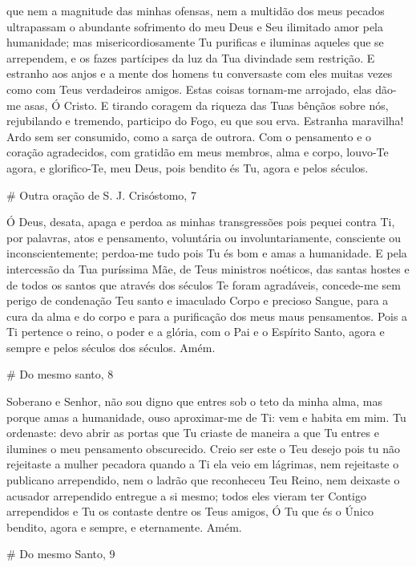 \documentclass{subfiles}
\begin{document}
que nem a magnitude das minhas ofensas, nem a multidão dos meus pecados
ultrapassam o abundante sofrimento do meu Deus e Seu ilimitado amor pela
humanidade; mas misericordiosamente Tu purificas e iluminas aqueles que se
arrependem, e os fazes partícipes da luz da Tua divindade sem restrição. E
estranho aos anjos e a mente dos homens tu conversaste com eles muitas vezes
como com Teus verdadeiros amigos. Estas coisas tornam-me arrojado, elas dão-me
asas, Ó Cristo. E tirando coragem da riqueza das Tuas bênçãos sobre nós,
rejubilando e tremendo, participo do Fogo, eu que sou erva. Estranha maravilha!
Ardo sem ser consumido, como a sarça de outrora. Com o pensamento e o coração
agradecidos, com gratidão em meus membros, alma e corpo, louvo-Te agora, e
glorifico-Te, meu Deus, pois bendito és Tu, agora e pelos séculos.

# Outra oração de S. J. Crisóstomo, 7

Ó Deus, desata, apaga e perdoa as minhas transgressões pois pequei
contra Ti, por palavras, atos e pensamento, voluntária ou involuntariamente,
consciente ou inconscientemente; perdoa-me tudo pois Tu és bom e amas a
humanidade. E pela intercessão da Tua puríssima Mãe, de Teus ministros
noéticos, das santas hostes e de todos os santos que através dos séculos Te
foram agradáveis, concede-me sem perigo de condenação Teu santo e
imaculado Corpo e precioso Sangue, para a cura da alma e do corpo e para a
purificação dos meus maus pensamentos. Pois a Ti pertence o reino, o poder
e a glória, com o Pai e o Espírito Santo, agora e sempre e pelos séculos dos
séculos. Amém.

# Do mesmo santo, 8

Soberano e Senhor, não sou digno que entres sob o teto da minha alma, mas porque
amas a humanidade, ouso aproximar-me de Ti: vem e habita em mim. Tu ordenaste:
devo abrir as portas que Tu criaste de maneira a que Tu entres e ilumines o meu
pensamento obscurecido. Creio ser este o Teu desejo pois tu não rejeitaste a
mulher pecadora quando a Ti ela veio em lágrimas, nem rejeitaste o publicano
arrependido, nem o ladrão que reconheceu Teu Reino, nem deixaste o acusador
arrependido entregue a si mesmo; todos eles vieram ter Contigo arrependidos e Tu
os contaste dentre os Teus amigos, Ó Tu que és o Único bendito, agora e sempre,
e eternamente. Amém.

# Do mesmo Santo, 9
\end{document}
